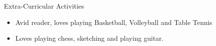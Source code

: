 \documentclass{resume} %
\begin{document}
\begin{rSection}{Extra-Curricular Activities} 
    \begin{itemize}
    \item 	Avid reader, loves playing Basketball, Volleyball and Table Tennis
    \item	Loves playing chess, sketching and playing guitar.
\end{itemize}


\end{rSection}

\end{document}
